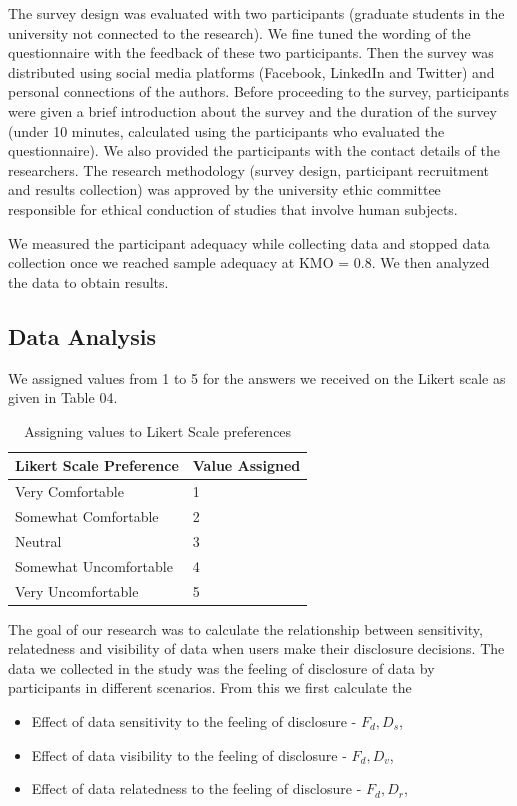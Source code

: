 \documentclass[conference]{IEEEtran}
\begin{document}
The survey design was evaluated with two participants (graduate students in the university not connected to the research). We fine tuned the wording of the questionnaire with the feedback of these two participants. Then the survey was distributed using social media platforms (Facebook, LinkedIn and Twitter) and personal connections of the authors. Before proceeding to the survey, participants were given a brief introduction about the survey and the duration of the survey (under 10 minutes, calculated using the participants who evaluated the questionnaire). We also provided the participants with the contact details of the researchers. The research methodology (survey design, participant recruitment and results collection) was approved by the university ethic committee responsible for ethical conduction of studies that involve human subjects.

We measured the participant adequacy while collecting data and stopped data collection once we reached sample adequacy at KMO = 0.8. We then analyzed the data to obtain results.

\subsection {Data Analysis}

We assigned values from 1 to 5 for the answers we received on the Likert scale as given in Table 04.

\begin{center}
\begin{table}[htbp]
\caption{Assigning values to Likert Scale preferences}
\begin{center}
\begin{tabular}{|l|l|} 
\hline
Likert Scale Preference & Value Assigned \\
\hline
Very Comfortable & 1\\
\hline
Somewhat Comfortable& 2 \\
\hline
Neutral & 3  \\
\hline
Somewhat Uncomfortable & 4 \\
\hline
Very Uncomfortable & 5 \\
\hline
\end{tabular}
\end{center}
\end{table}
\end{center}

The goal of our research was to calculate the relationship between sensitivity, relatedness and visibility of data when users make their disclosure decisions. The data we collected in the study was the feeling of disclosure of data by participants in different scenarios. From this we first calculate the
\begin{itemize}
\item Effect of data sensitivity to the feeling of disclosure -  $F_d,D_s$, 
\item Effect of data visibility to the feeling of disclosure -  $F_d,D_v$, 
\item Effect of data relatedness to the feeling of disclosure -  $F_d,D_r$, 
\end{itemize}
\end{document}
